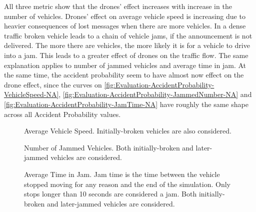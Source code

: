 \documentclass[]{nsm-thesis}
\begin{document}
All three metric show that the drones' effect increases with increase in the number of vehicles. Drones' effect on average vehicle speed is increasing due to heavier consequences of lost messages when there are more vehicles. In a dense traffic broken vehicle leads to a chain of vehicle jams, if the announcement is not delivered. The more there are vehicles, the more likely it is for a vehicle to drive into a jam. This leads to a greater effect of drones on the traffic flow. The same explanation applies to number of jammed vehicles and average time in jam. At the same time, the accident probability seem to have almost now effect on the drone effect, since the curves on \cref{fig:Evaluation-AccidentProbability-VehicleSpeed-NA}, \cref{fig:Evaluation-AccidentProbability-JammedNumber-NA} and \cref{fig:Evaluation-AccidentProbability-JamTime-NA} have roughly the same shape across all Accident Probability values.

\begin{figure}%
	\centering
	\hfill
	\hfill
	\caption{Average Vehicle Speed. Initially-broken vehicles are also considered.}%
	\label{fig:Evaluation-VehicleSpeed}%
\end{figure}

\begin{figure}%
	\centering
	\hfill
	\hfill
	\caption{Number of Jammed Vehicles. Both initially-broken and later-jammed vehicles are considered.}%
	\label{fig:Evaluation-JammedNumber}%
\end{figure}

\begin{figure}%
	\centering
	\hfill
	\hfill
	\caption{Average Time in Jam. Jam time is the time between the vehicle stopped moving for any reason and the end of the simulation. Only stops longer than 10 seconds are considered a jam. Both initially-broken and later-jammed vehicles are considered.}%
	\label{fig:Evaluation-JamTime}%
\end{figure}
\end{document}
